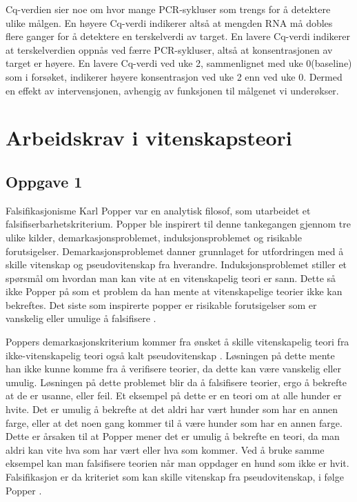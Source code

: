 \documentclass[
]{book}
\begin{document}
Cq-verdien sier noe om hvor mange PCR-sykluser som trengs for å detektere ulike målgen\citep{kuang2018}. En høyere Cq-verdi indikerer altså at mengden RNA må dobles flere ganger for å detektere en terskelverdi av target. En lavere Cq-verdi indikerer at terskelverdien oppnås ved færre PCR-sykluser, altså at konsentrasjonen av target er høyere. En lavere Cq-verdi ved uke 2, sammenlignet med uke 0(baseline) som i forsøket, indikerer høyere konsentrasjon ved uke 2 enn ved uke 0. Dermed en effekt av intervensjonen, avhengig av funksjonen til målgenet vi underøkser.

\hypertarget{arbeidskrav-i-vitenskapsteori}{%
\chapter{Arbeidskrav i vitenskapsteori}\label{arbeidskrav-i-vitenskapsteori}}

\hypertarget{oppgave-1}{%
\section{Oppgave 1}\label{oppgave-1}}

Falsifikasjonisme Karl Popper var en analytisk filosof, som utarbeidet et falsifiserbarhetskriterium. Popper ble inspirert til denne tankegangen gjennom tre ulike kilder, demarkasjonsproblemet, induksjonsproblemet og risikable forutsigelser. Demarkasjonsproblemet danner grunnlaget for utfordringen med å skille vitenskap og pseudovitenskap fra hverandre. Induksjonsproblemet stiller et spørsmål om hvordan man kan vite at en vitenskapelig teori er sann. Dette så ikke Popper på som et problem da han mente at vitenskapelige teorier ikke kan bekreftes. Det siste som inspirerte popper er risikable forutsigelser som er vanskelig eller umulige å falsifisere \citep{alnes2018}.

Poppers demarkasjonskriterium kommer fra ønsket å skille vitenskapelig teori fra ikke-vitenskapelig teori også kalt pseudovitenskap \citep{dellsén2021}. Løsningen på dette mente han ikke kunne komme fra å verifisere teorier, da dette kan være vanskelig eller umulig. Løsningen på dette problemet blir da å falsifisere teorier, ergo å bekrefte at de er usanne, eller feil. Et eksempel på dette er en teori om at alle hunder er hvite. Det er umulig å bekrefte at det aldri har vært hunder som har en annen farge, eller at det noen gang kommer til å være hunder som har en annen farge. Dette er årsaken til at Popper mener det er umulig å bekrefte en teori, da man aldri kan vite hva som har vært eller hva som kommer. Ved å bruke samme eksempel kan man falsifisere teorien når man oppdager en hund som ikke er hvit. Falsifikasjon er da kriteriet som kan skille vitenskap fra pseudovitenskap, i følge Popper \citep{okasha2016}.
\end{document}
